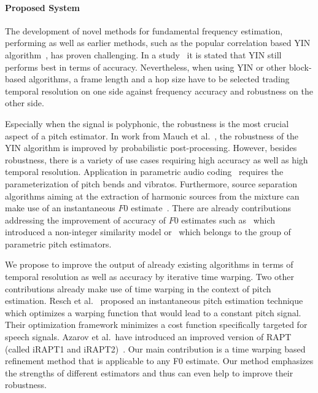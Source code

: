 \paragraph{Proposed System}
%
The development of novel methods for fundamental frequency estimation, performing as well as earlier methods, such as the popular correlation based \textsc{YIN} algorithm~\cite{decheveigne02}, has proven challenging.
In a study~\cite{babacan13} it is stated that YIN still performs best in terms of accuracy.
Nevertheless, when using YIN or other block-based algorithms, a frame length and a hop size have to be selected trading temporal resolution on one side against frequency accuracy and robustness on the other side.

Especially when the signal is polyphonic, the robustness is the most crucial aspect of a pitch estimator. In work from Mauch et al.~\cite{mauch14}, the robustness of the \textsc{YIN} algorithm is improved by probabilistic post-processing. However, besides robustness, there is a variety of use cases requiring high accuracy as well as high temporal resolution. Application in parametric audio coding~\cite{purnhagen00} requires the parameterization of pitch bends and vibratos. Furthermore, source separation algorithms aiming at the extraction of harmonic sources from the mixture can make use of an instantaneous $F0$ estimate~\cite{virtanen08, stoter14}. There are already contributions addressing the improvement of accuracy of $F0$ estimates such as~\cite{medan91} which introduced a non-integer similarity model or~\cite{christensen07} which belongs to the group of parametric pitch estimators.
\par
We propose to improve the output of already existing algorithms in terms of temporal resolution as well as accuracy by iterative time warping. Two other contributions already make use of time warping in the context of pitch estimation. Resch et al.~\cite{resch07} proposed an instantaneous pitch estimation technique which optimizes a warping function that would lead to a constant pitch signal. Their optimization framework minimizes a cost function specifically targeted for speech signals. Azarov et al.\ have introduced an improved version of RAPT (called iRAPT1 and iRAPT2)~\cite{azarov12}.
Our main contribution is a time warping based refinement method that is applicable to any F0 estimate. Our method emphasizes the strengths of different estimators and thus can even help to improve their robustness.

